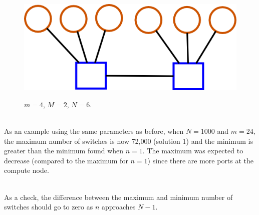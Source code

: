 \documentclass[pdftex]{article}
\begin{document}
\begin{figure}[h!]
\begin{center}
\includegraphics[scale=0.3]{pictures/N6_n1_M2_m4}
\label{fig:fewer_switches_M2}
 \caption{$m=4$, $M=2$, $N=6$.}
\end{center}
\end{figure}



\ \\
As an example using the same parameters as before, when $N=1000$ and $m=24$, the maximum number of switches is now 72,000 (solution 1) and the minimum is greater than the minimum found when $n=1$. The maximum was expected to decrease (compared to the maximum for $n=1$) since there are more ports at the compute node.

\ \\
As a check, the difference between the maximum and minimum number of switches should go to zero as $n$ approaches $N-1$. 
\end{document}
